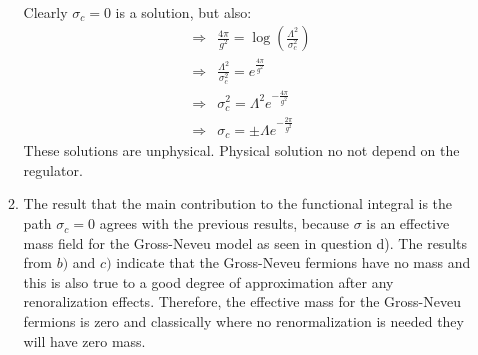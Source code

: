 \documentclass[12pt,a4]{article}
\begin{document}
\begin{enumerate}
\begin{enumerate}
\begin{align*}
        \end{align*}
        Clearly $\sigma_c = 0$ is a solution, but also:
        \begin{align*}
          \Rightarrow & \frac{4 \pi}{g^2} = \log\left(\frac{\Lambda^2}{\sigma^2_c}\right)\\
          \Rightarrow & \frac{\Lambda^2}{\sigma^2_c} = e^{\frac{4 \pi}{g^2}}\\
          \Rightarrow & \sigma^2_c = \Lambda^2 e^{- \frac{4 \pi}{g^2}}\\
          \Rightarrow & \sigma_c = \pm \Lambda e^{- \frac{2 \pi}{g^2}}
        \end{align*}
        These solutions are unphysical. 
        Physical solution no not depend on the regulator.
      \item
        The result that the main contribution to the functional integral is the path $\sigma_c = 0$ agrees with the previous results, because $\sigma$ is an effective mass field for the Gross-Neveu model as seen in question d).
        The results from $b)$ and $c)$ indicate that the Gross-Neveu fermions have no mass and this is also true to a good degree of approximation after any renoralization effects.
        Therefore, the effective mass for the Gross-Neveu fermions is zero and classically where no renormalization is needed they will have zero mass.
    \end{enumerate}
\end{enumerate}
\end{document}
